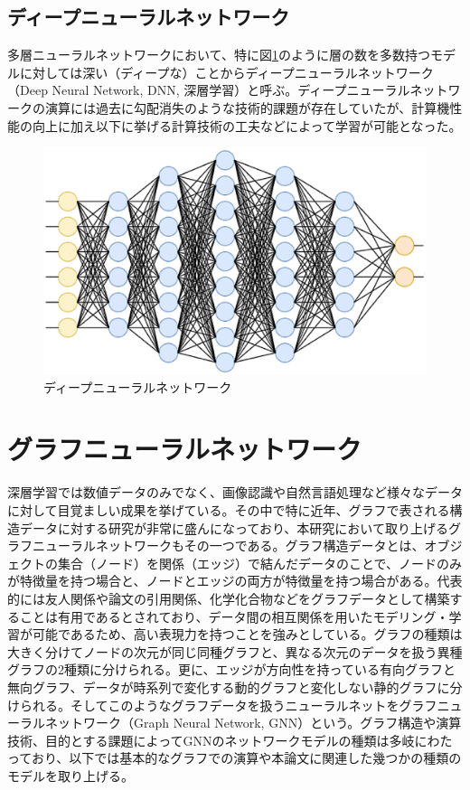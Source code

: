 \subsection{ディープニューラルネットワーク}
多層ニューラルネットワークにおいて、特に図\ref{dnn}のように層の数を多数持つモデルに対しては深い（ディープな）ことからディープニューラルネットワーク（Deep Neural Network, DNN, 深層学習）と呼ぶ。ディープニューラルネットワークの演算には過去に勾配消失のような技術的課題が存在していたが、計算機性能の向上に加え以下に挙げる計算技術の工夫などによって学習が可能となった。
\begin{figure}[h]
	\begin{center}
 \includegraphics[keepaspectratio, scale=0.4]
 	{Figure/Deeplearning/dnn.png}
 		\caption{ディープニューラルネットワーク}
 		\label{dnn}
	\end{center}
\end{figure}
\section{グラフニューラルネットワーク}
深層学習では数値データのみでなく、画像認識や自然言語処理など様々なデータに対して目覚ましい成果を挙げている。その中で特に近年、グラフで表される構造データに対する研究が非常に盛んになっており、本研究において取り上げるグラフニューラルネットワークもその一つである。グラフ構造データとは、オブジェクトの集合（ノード）を関係（エッジ）で結んだデータのことで、ノードのみが特徴量を持つ場合と、ノードとエッジの両方が特徴量を持つ場合がある。代表的には友人関係や論文の引用関係、化学化合物などをグラフデータとして構築することは有用であるとされており、データ間の相互関係を用いたモデリング・学習が可能であるため、高い表現力を持つことを強みとしている。グラフの種類は大きく分けてノードの次元が同じ同種グラフと、異なる次元のデータを扱う異種グラフの2種類に分けられる。更に、エッジが方向性を持っている有向グラフと無向グラフ、データが時系列で変化する動的グラフと変化しない静的グラフに分けられる。そしてこのようなグラフデータを扱うニューラルネットをグラフニューラルネットワーク（Graph Neural Network, GNN）という。グラフ構造や演算技術、目的とする課題によってGNNのネットワークモデルの種類は多岐にわたっており、以下では基本的なグラフでの演算や本論文に関連した幾つかの種類のモデルを取り上げる。\\
